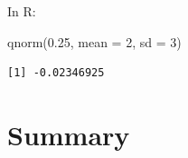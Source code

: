 \documentclass[
  letterpaper,
  DIV=11,
  numbers=noendperiod]{scrreprt}
\newenvironment{Shaded}{\begin{snugshade}}{\end{snugshade}}
\newcommand{\AttributeTok}[1]{\textcolor[rgb]{0.40,0.45,0.13}{#1}}
\newcommand{\DecValTok}[1]{\textcolor[rgb]{0.68,0.00,0.00}{#1}}
\newcommand{\FloatTok}[1]{\textcolor[rgb]{0.68,0.00,0.00}{#1}}
\newcommand{\FunctionTok}[1]{\textcolor[rgb]{0.28,0.35,0.67}{#1}}
\newcommand{\NormalTok}[1]{\textcolor[rgb]{0.00,0.23,0.31}{#1}}
\begin{document}
In R:

\begin{Shaded}
\begin{Highlighting}[]
\FunctionTok{qnorm}\NormalTok{(}\FloatTok{0.25}\NormalTok{, }\AttributeTok{mean =} \DecValTok{2}\NormalTok{, }\AttributeTok{sd =} \DecValTok{3}\NormalTok{)}
\end{Highlighting}
\end{Shaded}

\begin{verbatim}
[1] -0.02346925
\end{verbatim}

\hypertarget{summary-2}{%
\chapter{Summary}\label{summary-2}}
\end{document}

